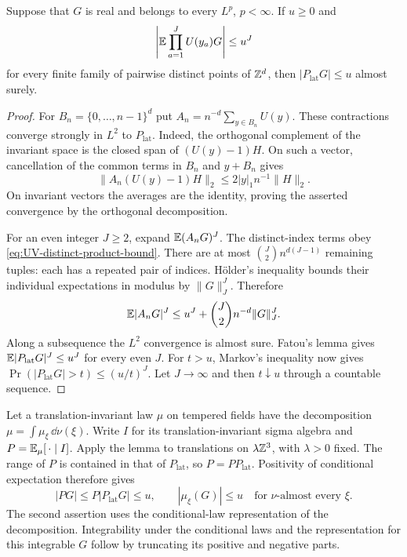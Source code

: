 \begin{lemma}\label{lem:UV-invariant-product-bound}
Suppose that $G$ is real and belongs to every $L^p$, $p<\infty$.
If $u\ge0$ and
\begin{equation}\label{eq:UV-distinct-product-bound}
 \left|\mathbb E\prod_{a=1}^J U(y_a)G\right|\le u^J
\end{equation}
for every finite family of pairwise distinct points of $\mathbb Z^d$,
then $|P_{\mathrm{lat}}G|\le u$ almost surely.
\end{lemma}

\begin{proof}
For $B_n=\{0,\ldots,n-1\}^d$ put
$A_n=n^{-d}\sum_{y\in B_n}U(y)$. These contractions converge
strongly in $L^2$ to $P_{\mathrm{lat}}$.
Indeed, the orthogonal complement of the invariant space is the
closed span of $(U(y)-1)H$. On such a vector, cancellation of
the common terms in $B_n$ and $y+B_n$ gives
\[
 \|A_n(U(y)-1)H\|_2\le2|y|_1n^{-1}\|H\|_2.
\]
On invariant vectors the averages are the identity, proving
the asserted convergence by the orthogonal decomposition.

For an even integer $J\ge2$, expand $\mathbb E(A_nG)^J$.
The distinct-index terms obey \eqref{eq:UV-distinct-product-bound}.
There are at most $\binom J2 n^{d(J-1)}$ remaining tuples:
each has a repeated pair of indices. H\"older's inequality
bounds their individual expectations in modulus by
$\|G\|_J^J$. Therefore
\[
 \mathbb E|A_nG|^J
       \le u^J+\binom J2 n^{-d}\|G\|_J^J.
\]
Along a subsequence the $L^2$ convergence is almost sure.
Fatou's lemma gives $\mathbb E|P_{\mathrm{lat}}G|^J\le u^J$
for every even $J$. For $t>u$, Markov's inequality now gives
$\Pr(|P_{\mathrm{lat}}G|>t)\le(u/t)^J$.
Let $J\to\infty$ and then $t\downarrow u$ through a countable
sequence.
\end{proof}

Let a translation-invariant law $\mu$ on tempered fields have
the decomposition $\mu=\int\mu_\xi\,\dd\nu(\xi)$.
Write $I$ for its translation-invariant sigma algebra and
$P=\mathbb E_\mu[\,\cdot\mid I]$. Apply the lemma to translations
on $\lambda\mathbb Z^3$, with $\lambda>0$ fixed. The range of $P$
is contained in that of $P_{\mathrm{lat}}$, so
$P=PP_{\mathrm{lat}}$. Positivity of conditional expectation
therefore gives
\begin{equation}\label{eq:UV-component-product-bound}
 |PG|\le P|P_{\mathrm{lat}}G|\le u,\qquad
 |\mu_\xi(G)|\le u\quad\text{for }\nu\text{-almost every }\xi.
\end{equation}
The second assertion uses the conditional-law representation of
the decomposition. Integrability under the conditional laws and
the representation for this integrable $G$ follow by truncating
its positive and negative parts.

